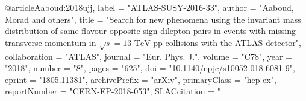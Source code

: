 

@article{Aaboud:2018ujj,
      label          = "ATLAS-SUSY-2016-33",
      author         = "Aaboud, Morad and others",
      title          = "{Search for new phenomena using the invariant mass
                        distribution of same-flavour opposite-sign dilepton pairs
                        in events with missing transverse momentum in
                        $\sqrt{s}=13$   $\text {Te}\text {V}$ pp collisions with
                        the ATLAS detector}",
      collaboration  = "ATLAS",
      journal        = "Eur. Phys. J.",
      volume         = "C78",
      year           = "2018",
      number         = "8",
      pages          = "625",
      doi            = "10.1140/epjc/s10052-018-6081-9",
      eprint         = "1805.11381",
      archivePrefix  = "arXiv",
      primaryClass   = "hep-ex",
      reportNumber   = "CERN-EP-2018-053",
      SLACcitation   = "%
}

